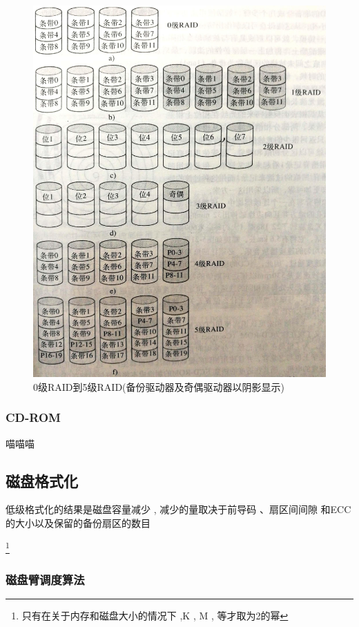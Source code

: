 \documentclass[UTF8,a4paper]{ctexart}
\begin{document}
\begin{figure}[H]
	\centering
	\includegraphics[scale = 0.3]{assets/ModernOperatingSystems/2018-01-10-17-53-40.png}
	\caption{0级RAID到5级RAID(备份驱动器及奇偶驱动器以阴影显示)}
\end{figure}

\subsubsection{CD-ROM}
喵喵喵

\subsection{磁盘格式化}
低级格式化的结果是磁盘容量减少 , 减少的量取决于前导码 、扇区间间隙 和ECC的大小以及保留的备份扇区的数目

\footnote{\color{red}只有在关于内存和磁盘大小的情况下 ,K , M , 等才取为2的幂}


\subsubsection{磁盘臂调度算法}
\end{document}

